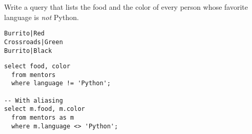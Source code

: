 \begin{blocksection}
\question Write a query that lists the food and the color of every person whose
favorite language is \emph{not} Python.

\begin{lstlisting}
Burrito|Red
Crossroads|Green
Burrito|Black
\end{lstlisting}

\begin{solution}[1in]
\begin{lstlisting}
select food, color
  from mentors
  where language != 'Python';

-- With aliasing
select m.food, m.color
  from mentors as m
  where m.language <> 'Python';
\end{lstlisting}
\end{solution}
\end{blocksection}
